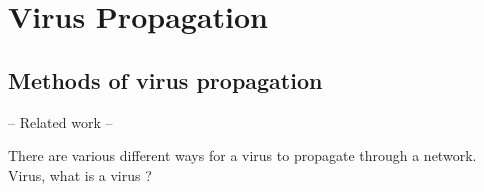 \chapter{Virus Propagation }
\label{chapter4: Virus propagation}
%
%
%
%
%
%
%
\section{Methods of virus propagation}
-- Related work --

There are various different ways for a virus to propagate through a network.
Virus, what is a virus ?

